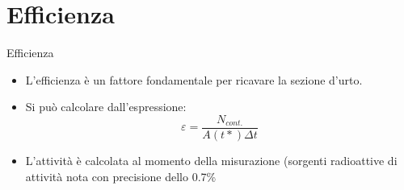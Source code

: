 \documentclass [xcolor=svgnames] {beamer}
\begin{document}
\section{Efficienza}
\begin{frame}{Efficienza}
	\begin{itemize}
		\item<1-> L'efficienza è un fattore fondamentale per ricavare la sezione d'urto.
		\item<2-> Si può calcolare dall'espressione:
		\begin{equation}
			\varepsilon = \dfrac{N_{cont.}}{A(t*) \Delta t}
		\end{equation}
		\item<3-> L'attività è calcolata al momento della misurazione (sorgenti radioattive di attività nota con precisione dello 0.7\% %
	\end{itemize}
	
	\vspace{0.5cm}
	

\end{frame}
\end{document}

